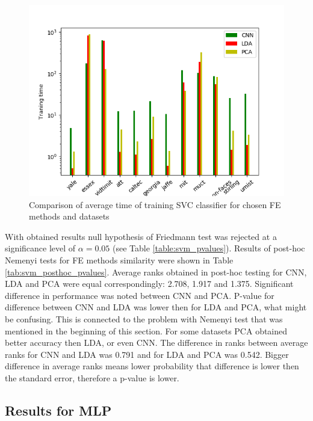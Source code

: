 \documentclass[a4paper, 10 pt, journal]{ieeeconf}
\begin{document}
\begin{figure}[!h]
    \centering
    \includegraphics[scale=0.875]{images/Svm_fit_time_comparison.png}
    \caption{Comparison of average time of training SVC classifier for chosen FE methods and datasets}
    \label{fig:svm_fit_time_comparision}
\end{figure}

\newpage

With obtained results null hypothesis of Friedmann test was rejected at a significance level of $\alpha = 0.05$ (see Table \ref{table:svm_pvalues}). 
Results of post-hoc Nemenyi tests for FE methods similarity were shown in Table \ref{tab:svm_posthoc_pvalues}. 
Average ranks obtained in post-hoc testing for CNN, LDA and PCA were equal correspondingly: 2.708, 1.917 and 1.375.
Significant difference in performance was noted between CNN and PCA.
P-value for difference between CNN and LDA was lower then for LDA and PCA, what might be confusing. This is connected to the problem with Nemenyi test that was mentioned in the beginning of this section. For some datasets PCA obtained better accuracy then LDA, or even CNN. The difference in ranks between average ranks for CNN and LDA was 0.791 and for LDA and PCA was 0.542. Bigger difference in average ranks means lower probability that difference is lower then the standard error, therefore a p-value is lower. 

\newpage

\subsection{Results for MLP}
\end{document}
